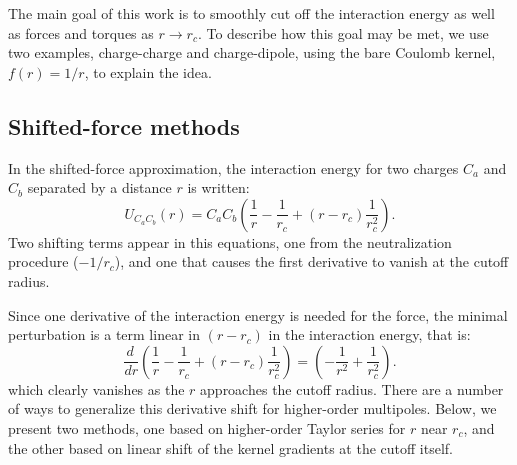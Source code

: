 The main goal of this work is to smoothly cut off the interaction
energy as well as forces and torques as $r\rightarrow r_c$.  To
describe how this goal may be met, we use two examples, charge-charge
and charge-dipole, using the bare Coulomb kernel, $f(r)=1/r$, to
explain the idea.
\subsection{Shifted-force methods}
In the shifted-force approximation, the interaction energy for two
charges $C_a$ and $C_b$ separated by a distance $r$ is
written:
\begin{equation}
U_{C_aC_b}(r)= C_a C_b
\left({ \frac{1}{r} - \frac{1}{r_c} + (r - r_c) \frac{1}{r_c^2}  }
\right) .
\end{equation}
Two shifting terms appear in this equations, one from the
neutralization procedure ($-1/r_c$), and one that causes the first
derivative to vanish at the cutoff radius.

Since one derivative of the interaction energy is needed for the
force, the minimal perturbation is a term linear in $(r-r_c)$ in the
interaction energy, that is:
\begin{equation}
\frac{d\,}{dr} 
\left( {\frac{1}{r} - \frac{1}{r_c} + (r - r_c) \frac{1}{r_c^2}  }
\right) = \left(- \frac{1}{r^2} + \frac{1}{r_c^2} 
\right) .
\end{equation}
which clearly vanishes as the $r$ approaches the cutoff radius. There
are a number of ways to generalize this derivative shift for
higher-order multipoles.  Below, we present two methods, one based on
higher-order Taylor series for $r$ near $r_c$, and the other based on
linear shift of the kernel gradients at the cutoff itself.


